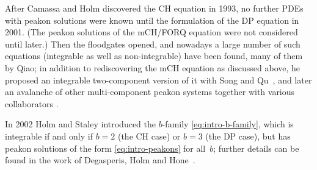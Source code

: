 \documentclass[10pt,a4paper]{article} \pdfoutput=1 
\begin{document}
After Camassa and Holm discovered the CH equation in 1993,
no further PDEs with peakon solutions were known until the
formulation of the DP equation in 2001.
(The peakon solutions of the mCH/FORQ equation were
not considered until later.)
Then the floodgates opened, and nowadays a large number of such equations
(integrable as well as non-integrable) have been found,
many of them by Qiao;
in addition to rediscovering the mCH equation as discussed above,
he proposed an integrable two-component version of it with Song and Qu~\cite{song-qu-qiao:2011:2mCH-new-integrable-twocomponent-cubic-nonlinearity},
and later an avalanche of other multi-component peakon systems together with various collaborators
\cite{qiao-xia:2013:integrable-peakon-systems-with-kink-peakon,
  xia-qiao:2015:two-component-CH-with-peakons,
  xia-qiao-zhou:2015:synthetical-twocomponent-model-peakons,
  xia-zhou-qiao:2015:cubic-3CH-peakons,
  xia-qiao:2016:multicomponent-generalization-CH,
  luo-qiao-lopez:2014:integrable-generalization-associated-CH,
  hu-qiao:2016:multicomponent-peakon-system-arbitrary-polynomial-analyticity-gevrey-regularity-unique-continuation,
  lou-qiao:2017:alice-bob-peakon-systems,
  yan-qiao-zhang:2018:new-twocomponent-b-family-cubic,
  zhou-qiao-mu:2020:continuity-generalized-crosscoupled-CH-waltzing-peakons-higher-order-nonlinearities}.


In 2002 Holm and Staley
\cite{holm-staley:2003:wave-structure-nonlinear-balances-family-of-evolutionary-PDEs,
  holm-staley:2003:nonlinear-balance-exchange-of-stability-solitons-ramps-cliffs-leftons}
introduced the $b$-family \eqref{eq:intro-b-family},
which is integrable if and only if $b=2$ (the CH case) or $b=3$ (the DP case),
but has peakon solutions of the form \eqref{eq:intro-peakons} for all~$b$;
further details can be found in the work of Degasperis, Holm and Hone~\cite{degasperis-holm-hone:2003:integrable-and-nonintegrable-peakons}.
\end{document}
